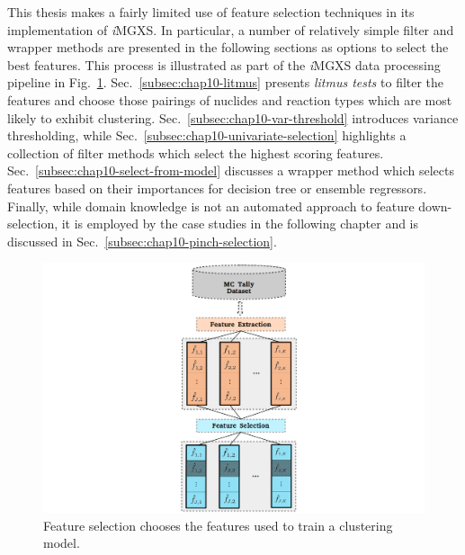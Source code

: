 This thesis makes a fairly limited use of feature selection techniques in its implementation of \textit{i}\ac{MGXS}. In particular, a number of relatively simple filter and wrapper methods are presented in the following sections as options to select the best features. This process is illustrated as part of the \textit{i}\ac{MGXS} data processing pipeline in Fig.~\ref{fig:chap10-select}. Sec.~\ref{subsec:chap10-litmus} presents \textit{litmus tests} to filter the features and choose those pairings of nuclides and reaction types which are most likely to exhibit clustering. Sec.~\ref{subsec:chap10-var-threshold} introduces variance thresholding, while Sec.~\ref{subsec:chap10-univariate-selection} highlights a collection of filter methods which select the highest scoring features. Sec.~\ref{subsec:chap10-select-from-model} discusses a wrapper method which selects features based on their importances for decision tree or ensemble regressors. Finally, while domain knowledge is not an automated approach to feature down-selection, it is employed by the case studies in the following chapter and is discussed in Sec.~\ref{subsec:chap10-pinch-selection}.


\begin{figure}[h!]
\centering
\includegraphics[width=0.95\linewidth]{figures/unsupervised/features/engineering/select}
\vspace{2mm}
\caption[\textit{i}MGXS feature selection]{Feature selection chooses the features used to train a clustering model.}
\label{fig:chap10-select}
\end{figure}

